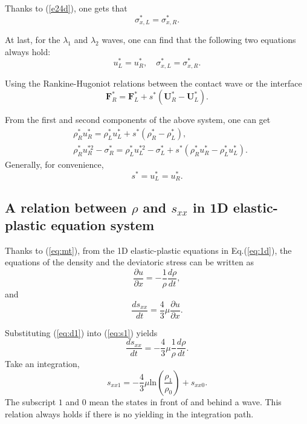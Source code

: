 \documentclass{article}
\numberwithin{equation}{section}
\numberwithin{table}{section}
\begin{document}
Thanks to (\ref{e24d}), one gets that
\begin{equation}   \label{e27a}
\sigma_{x,L} ^{\ast}=  \sigma_{x,R} ^{\ast}.
\end{equation}


At last, for the $\lambda_{1}$ and $\lambda_{2}$ waves, one can find
that the following two equations always hold:
\begin{equation}   \label{e28}
u_{L}^{\ast}=u_{R}^{\ast}, \quad
\sigma_{x,L}^{\ast}=\sigma_{x,R}^{\ast}.
\end{equation}

Using  the Rankine-Hugoniot relations between the contact wave  or  the interface
\begin{equation}
	\bm{F}_R^* = \bm{F}_L^*+s^*(\bm{U}_R^*-\bm{U}_L^*).
\end{equation}

From the first and second components of the above system, one can get
\begin{align}
  & \rho_R^* u_R^*=\rho_L^* u_L^*+s^*(\rho_R^*-\rho_L^*),\\
  & \rho_R^* u_R^{*2}-\sigma^*_R=\rho_L^* u_L^{*2}-\sigma_L^*+s^*(\rho_R^* u_R^*-\rho_L^* u_L^*).
\end{align}
Generally, for convenience,
\begin{equation}\label{eq:contact}
  s^* = u_L^* = u_R^*. %
\end{equation}

\subsection{A relation between $\rho$ and $s_{xx}$ in 1D elastic-plastic  equation system}

Thanks to (\ref{eq:mt}), from the 1D elastic-plastic  equations in Eq.(\ref{eq:1d}), the equations of the density and the deviatoric stress can be written as
  \begin{equation}\label{eq:d1}
	\frac{\partial u}{\partial x} = -\frac{1}{\rho}\frac{d\rho}{dt},
  \end{equation}
  and
  \begin{equation}\label{eq:s1}
	\frac{ds_{xx}}{dt}=\frac{4}{3}\mu\frac{\partial u}{\partial x}.
  \end{equation}

  Substituting (\ref{eq:d1}) into (\ref{eq:s1}) yields
  \begin{equation}
	\frac{ds_{xx}}{dt}=-\frac{4}{3}\mu \frac{1}{\rho}\frac{d\rho}{dt}.
\end{equation}
Take an integration,
\begin{equation}\label{eq:rhosxx}
  s_{xx1}=-\frac{4}{3}\mu\text{ln}(\frac{\rho_{1}}{\rho_{0}})+s_{xx0}.
\end{equation}
The subscript $1$ and $0$ mean the states in front of and behind a wave.
This relation always holds if there is no yielding in the integration path.
\end{document}
